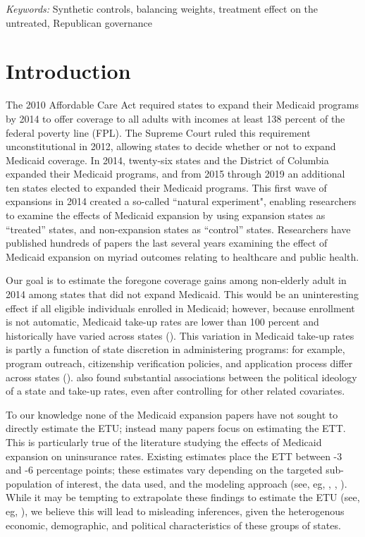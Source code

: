 \documentclass[12pt]{article}
\begin{document}
\noindent%
{\it Keywords:} Synthetic controls, balancing weights, treatment effect on the untreated, Republican governance
\vfill

\newpage
{} %
\section{Introduction}
\label{sec:intro}

The 2010 Affordable Care Act required states to expand their Medicaid programs by 2014 to offer coverage to all adults with incomes at least 138 percent of the federal poverty line (FPL). The Supreme Court ruled this requirement unconstitutional in 2012, allowing states to decide whether or not to expand Medicaid coverage. In 2014, twenty-six states and the District of Columbia expanded their Medicaid programs, and from 2015 through 2019 an additional ten states elected to expanded their Medicaid programs. This first wave of expansions in 2014 created a so-called ``natural experiment", enabling researchers to examine the effects of Medicaid expansion by using expansion states as ``treated'' states, and non-expansion states as ``control'' states. Researchers have published hundreds of papers the last several years examining the effect of Medicaid expansion on myriad outcomes relating to healthcare and public health.

Our goal is to estimate the foregone coverage gains among non-elderly adult in 2014 among states that did not expand Medicaid. This would be an uninteresting effect if all eligible individuals enrolled in Medicaid; however, because enrollment is not automatic, Medicaid take-up rates are lower than 100 percent and historically have varied across states (\cite{sommers2012understanding}). This variation in Medicaid take-up rates is partly a function of state discretion in administering programs: for example, program outreach, citizenship verification policies, and application process differ across states (\cite{courtemanche2017early}). \cite{sommers2012understanding} also found substantial associations between the political ideology of a state and take-up rates, even after controlling for other related covariates.

To our knowledge none of the Medicaid expansion papers have not sought to directly estimate the ETU; instead many papers focus on estimating the ETT. This is particularly true of the literature studying the effects of Medicaid expansion on uninsurance rates. Existing estimates place the ETT between -3 and -6 percentage points; these estimates vary depending on the targeted sub-population of interest, the data used, and the modeling approach (see, eg, \cite{courtemanche2017early}, \cite{kaestner2017effects}, \cite{frean2017premium}). While it may be tempting to extrapolate these findings to estimate the ETU (see, eg, \cite{miller2019medicaid}), we believe this will lead to misleading inferences, given the heterogenous economic, demographic, and political characteristics of these groups of states.
\end{document}
